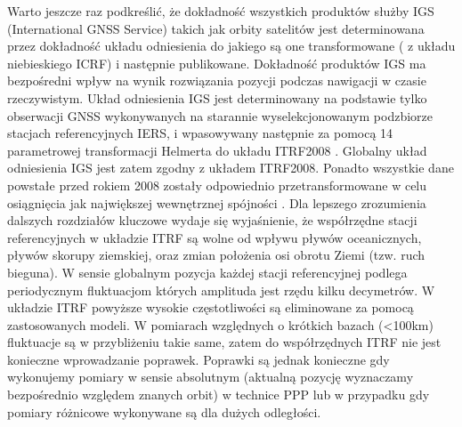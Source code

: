 Warto jeszcze raz podkreślić, że dokładność wszystkich produktów służby IGS (International GNSS Service) takich jak orbity satelitów jest determinowana 
przez dokładność układu odniesienia do jakiego są one transformowane ( z układu niebieskiego ICRF) i następnie publikowane. Dokładność produktów IGS 
ma bezpośredni wpływ na wynik rozwiązania pozycji podczas nawigacji w czasie rzeczywistym.
Układ odniesienia IGS jest determinowany na podstawie tylko obserwacji GNSS wykonywanych na starannie wyselekcjonowanym podzbiorze 
stacjach referencyjnych IERS, i wpasowywany następnie za pomocą 14 parametrowej transformacji Helmerta do układu ITRF2008 \cite[]{ALTAMIMI_2009}.
Globalny układ odniesienia IGS jest zatem zgodny z układem ITRF2008. Ponadto wszystkie dane powstałe przed rokiem 2008 zostały odpowiednio 
przetransformowane w celu osiągnięcia jak największej wewnętrznej spójności \cite[][strona 15]{KOUBA_2009}.
Dla lepszego zrozumienia dalszych rozdziałów kluczowe wydaje się wyjaśnienie, że współrzędne stacji referencyjnych w układzie ITRF 
są wolne od wpływu pływów oceanicznych, pływów skorupy ziemskiej, oraz zmian położenia osi obrotu Ziemi (tzw. ruch bieguna).
W sensie globalnym pozycja każdej stacji referencyjnej podlega periodycznym fluktuacjom których amplituda jest rzędu kilku
decymetrów. W układzie ITRF powyższe wysokie częstotliwości są eliminowane za pomocą zastosowanych modeli. W pomiarach względnych o krótkich
bazach (<100km) fluktuacje są w przybliżeniu takie same, zatem do współrzędnych ITRF nie jest konieczne wprowadzanie poprawek.
Poprawki są jednak konieczne gdy wykonujemy pomiary w sensie absolutnym (aktualną pozycję wyznaczamy bezpośrednio względem znanych orbit)
w technice PPP lub w przypadku gdy pomiary różnicowe wykonywane są dla dużych odległości. \cite[][strona 11]{KOUBA_2009}

